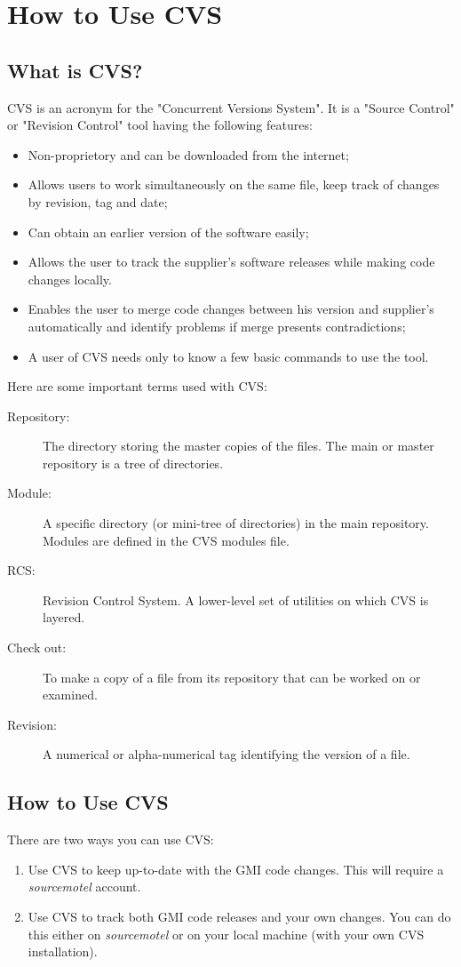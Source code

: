 \chapter[How to Use CVS]{How to Use CVS} \label{chap:cvs}

\section{What is CVS?}
%
CVS is an acronym for the "Concurrent Versions System". 
It is a "Source Control" or "Revision Control" tool having the following
features:
%
\begin{itemize}
\item Non-proprietory and can be downloaded from the internet;
\item Allows users to work simultaneously on the same file, keep track of changes 
      by revision, tag and date;
\item Can obtain an earlier version of the software easily;
\item Allows the user to track the supplier's software releases while making
      code changes locally.
\item Enables the user to merge code changes between his version and supplier's
      automatically and identify problems if merge presents contradictions;
\item A user of CVS needs only to know a few basic commands to use the tool.
\end{itemize}
%
Here are some important terms used with CVS:
%
\begin{description}
\item[Repository:] The directory storing the master copies of the files. 
     The main or master repository is a tree of directories. 
\item[Module:] A specific directory (or mini-tree of directories) in the 
     main repository. Modules are defined in the CVS modules file.
\item[RCS:] Revision Control System. A lower-level set of utilities on 
     which CVS is layered.
\item[Check out:] To make a copy of a file from its repository that can 
     be worked on or examined.
\item[Revision:] A numerical or alpha-numerical tag identifying the version of a file.
\end{description}

\section{How to Use CVS}
%
There are two ways you can use CVS:
%
\begin{enumerate}
\item Use CVS to keep up-to-date with the GMI code changes.
      This will require a {\em sourcemotel} account.
\item Use CVS to track both GMI code releases and your own changes.
      You can do this either on {\em sourcemotel} or on your local machine
     (with your own CVS installation).
\end{enumerate}

